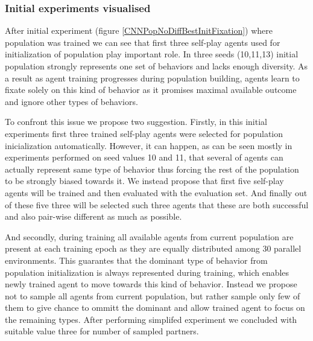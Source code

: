 \subsubsection{Initial experiments visualised}

After initial experiment (figure \ref{CNNPopNoDiffBestInitFixation}) where population was trained we can see that first three self-play agents used for initialization of population play important role.
In three seeds (10,11,13) initial population strongly represents one set of behaviors and lacks enough diversity.
As a result as agent training progresses during population building, agents learn to fixate solely on this kind of behavior as it promises maximal available outcome and ignore other types of behaviors.

To confront this issue we propose two suggestion.
Firstly, in this initial experiments first three trained self-play agents were selected for population inicialization automatically.
However, it can happen, as can be seen mostly in experiments performed on seed values 10 and 11, that several of agents can actually represent same type of behavior thus forcing the rest of the population to be strongly biased towards it.
We instead propose that first five self-play agents will be trained and then evaluated with the evaluation set.
And finally out of these five three will be selected such three agents that these are both successful and also pair-wise different as much as possible.

And secondly, during training all available agents from current population are present at each training epoch as they are equally distributed among 30 parallel environments.
This guarantes that the dominant type of behavior from population initialization is always represented during training, which enables newly trained agent to move towards this kind of behavior.
Instead we propose not to sample all agents from current population, but rather sample only few of them to give chance to ommitt the dominant and allow trained agent to focus on the remaining types.
After performing simplifed experiment we concluded with suitable value three for number of sampled partners.  


